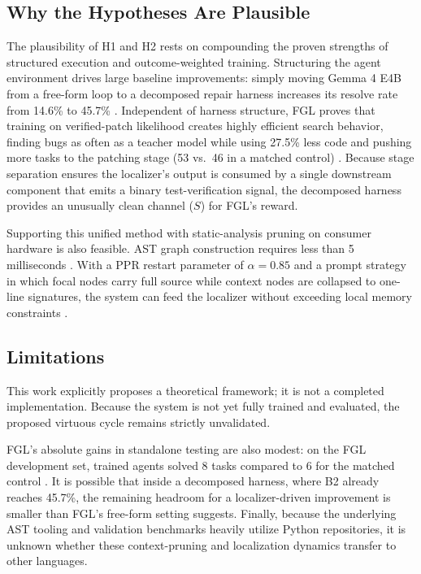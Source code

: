 \documentclass[11pt,a4paper]{article}
\begin{document}
\subsection{Why the Hypotheses Are Plausible}
The plausibility of H1 and H2 rests on compounding the proven strengths of structured execution and outcome-weighted training. Structuring the agent environment drives large baseline improvements: simply moving Gemma 4 E4B from a free-form loop to a decomposed repair harness increases its resolve rate from 14.6\% to 45.7\% \cite{LOOP}. Independent of harness structure, FGL proves that training on verified-patch likelihood creates highly efficient search behavior, finding bugs as often as a teacher model while using 27.5\% less code \cite{FGL} and pushing more tasks to the patching stage (53 vs.\ 46 in a matched control) \cite{FGL}. Because stage separation ensures the localizer's output is consumed by a single downstream component that emits a binary test-verification signal, the decomposed harness provides an unusually clean channel ($S$) for FGL's reward.

Supporting this unified method with static-analysis pruning on consumer hardware is also feasible. AST graph construction requires less than 5 milliseconds \cite{TOPAZ}. With a PPR restart parameter of $\alpha = 0.85$ and a prompt strategy in which focal nodes carry full source while context nodes are collapsed to one-line signatures, the system can feed the localizer without exceeding local memory constraints \cite{TOPAZ}.

\subsection{Limitations}
This work explicitly proposes a theoretical framework; it is not a completed implementation. Because the system is not yet fully trained and evaluated, the proposed virtuous cycle remains strictly unvalidated.

FGL's absolute gains in standalone testing are also modest: on the FGL development set, trained agents solved 8 tasks compared to 6 for the matched control \cite{FGL}. It is possible that inside a decomposed harness, where B2 already reaches 45.7\%, the remaining headroom for a localizer-driven improvement is smaller than FGL's free-form setting suggests. Finally, because the underlying AST tooling and validation benchmarks heavily utilize Python repositories, it is unknown whether these context-pruning and localization dynamics transfer to other languages.
\end{document}

